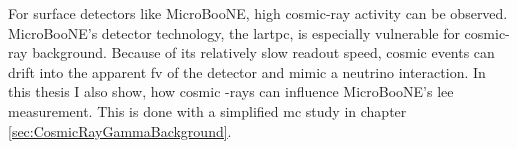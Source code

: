 For surface detectors like MicroBooNE, high cosmic-ray activity can be observed. MicroBooNE's detector technology, the \gls{lartpc}, is especially vulnerable for cosmic-ray background. Because of its relatively slow readout speed, cosmic events can drift into the apparent \gls{fv} of the detector and mimic a neutrino interaction. In this thesis I also show, how cosmic \textgamma-rays can influence MicroBooNE's \gls{lee} measurement. This is done with a simplified \gls{mc} study in chapter \ref{sec:CosmicRayGammaBackground}.

% 

